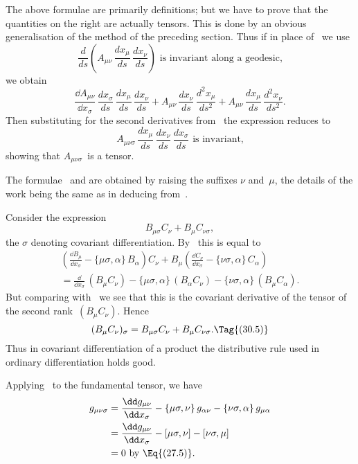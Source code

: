 \documentclass[12pt]{book}
\begin{document}
The above formulae are primarily definitions; but we have to prove that
the quantities on the right are actually tensors. This is done by an obvious
generalisation of the method of the preceding section. Thus if in place of~
we use
\[
\frac{d}{ds} \left(A_{\mu\nu}\, \frac{dx_{\mu}}{ds}\, \frac{dx_{\nu}}{ds}\right)
\text{ is invariant along a geodesic,}
\]
we obtain
\[
\frac{\dd A_{\mu\nu}}{\dd x_{\sigma}}\, \frac{dx_{\sigma}}{ds}\, \frac{dx_{\mu}}{ds}\, \frac{dx_{\nu}}{ds}
+ A_{\mu\nu}\, \frac{dx_{\nu}}{ds}\, \frac{d^{2}x_{\mu}}{ds^{2}}
+ A_{\mu\nu}\, \frac{dx_{\mu}}{ds}\, \frac{d^{2}x_{\nu}}{ds^{2}}.
\]
Then substituting for the second derivatives from~ the expression
reduces to
\[
A_{\mu\nu\sigma}\, \frac{dx_{\mu}}{ds}\, \frac{dx_{\nu}}{ds}\, \frac{dx_{\sigma}}{ds}
\text{ is invariant,}
\]
showing that $A_{\mu\nu\sigma}$~is a tensor.

The formulae ~and  are obtained by raising the suffixes $\nu$ and~$\mu$,
the details of the work being the same as in deducing  from~.

Consider the expression
\[
B_{\mu\sigma} C_{\nu} + B_{\mu} C_{\nu\sigma},
\]
the $\sigma$ denoting covariant differentiation. By~ this is equal to
\begin{multline*}
\left(\frac{\dd B_{\mu}}{\dd x_{\sigma}} - \{\mu\sigma, \alpha\}\, B_{\alpha}\right) C_{\nu}
+ B_{\mu} \left(\frac{\dd C_{\nu}}{\dd x_{\sigma}} - \{\nu\sigma, \alpha\}\, C_{\alpha}\right) \\
= \frac{\dd}{\dd x_{\sigma}}\, (B_{\mu} C_{\nu})
  - \{\mu\sigma, \alpha\}\, (B_{\alpha} C_{\nu})
  - \{\nu\sigma, \alpha\}\, (B_{\mu} C_{\alpha}).
\end{multline*}
But comparing with~ we see that this is the covariant derivative of the
%
%
tensor of the second rank~$(B_{\mu}C_{\nu})$. Hence
\[
(B_{\mu} C_{\nu})_{\sigma} = B_{\mu\sigma} C_{\nu} + B_{\mu} C_{\nu\sigma}.
\Tag{(30.5)}
\]
Thus in covariant differentiation of a product the distributive rule used in
ordinary differentiation holds good.

Applying~ to the fundamental tensor, we have
\begin{align*}
  g_{\mu\nu\sigma}
  &= \frac{\dd g_{\mu\nu}}{\dd x_{\sigma}} - \{\mu\sigma, \nu\}\, g_{\alpha\nu} - \{\nu\sigma, \alpha\}\, g_{\mu\alpha} \\
  &= \frac{\dd g_{\mu\nu}}{\dd x_{\sigma}} - [\mu\sigma, \nu] - [\nu\sigma, \mu] \\
  &= 0 \text{ by \Eq{(27.5)}.}
\end{align*}
\end{document}
